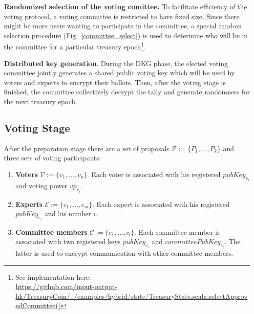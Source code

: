 \textbf{Randomized selection of the voting comittee.} To facilitate efficiency of the voting protocol, a voting committee is restricted to have fixed size. Since there might be more users wanting to participate in the committee, a special random selection procedure (Fig.~\ref{committee_select}) is used to determine who will be in the committee for a particular treasury epoch\footnote{See implementation here:\\ \href{https://github.com/input-output-hk/TreasuryCoin/blob/master/examples/src/main/scala/examples/hybrid/state/TreasuryState.scala\#L367}{https://github.com/input-output-hk/TreasuryCoin/../examples/hybrid/state/TreasuryState.scala:selectApprovedCommittee()}}.


\textbf{Distributed key generation}. During the DKG phase, the elected voting committee jointly generates a shared public voting key which will be used by voters and experts to encrypt their ballots. Then, after the voting stage is finished, the committee collectively decrypt the tally and generate randomness for the next treasury epoch.

\subsection{Voting Stage}
After the preparation stage there are a set of proposals $\mathcal{P}:=\{P_1,\ldots, P_k \}$ and three sets of voting participants:
\begin{enumerate}
    \item \textbf{Voters} $\mathcal{V}:=\{v_1,\ldots, v_n \}$. Each voter is associated with his registered $pubKey_{v_i}$ and voting power $vp_{v_i}$.
    \item \textbf{Experts} $\mathcal{E}:=\{e_1,\ldots, e_m \}$. Each expert is associated with his registered $pubKey_{e_i}$ and his number $i$. 
    \item \textbf{Committee members} $\mathcal{C}:=\{c_1,\ldots, c_l \}$. Each committee member is associated with two registered keys $pubKey_{c_i}$ and $committeePubKey_{c_i}$. The latter is used to encrypt communication with other committee members.
\end{enumerate}

